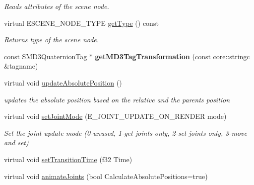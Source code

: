 \begin{DoxyCompactItemize}
\begin{DoxyCompactList}\small\item\em Reads attributes of the scene node. \end{DoxyCompactList}\item 
\hypertarget{classirr_1_1scene_1_1_c_animated_mesh_scene_node_a9f598a060ecf7f6b189f4c67db7e97e8}{virtual E\-S\-C\-E\-N\-E\-\_\-\-N\-O\-D\-E\-\_\-\-T\-Y\-P\-E \hyperlink{classirr_1_1scene_1_1_c_animated_mesh_scene_node_a9f598a060ecf7f6b189f4c67db7e97e8}{get\-Type} () const }\label{classirr_1_1scene_1_1_c_animated_mesh_scene_node_a9f598a060ecf7f6b189f4c67db7e97e8}

\begin{DoxyCompactList}\small\item\em Returns type of the scene node. \end{DoxyCompactList}\item 
\hypertarget{classirr_1_1scene_1_1_c_animated_mesh_scene_node_a3874ee494497b6b73233bfdbe3053389}{const S\-M\-D3\-Quaternion\-Tag $\ast$ {\bfseries get\-M\-D3\-Tag\-Transformation} (const core\-::stringc \&tagname)}\label{classirr_1_1scene_1_1_c_animated_mesh_scene_node_a3874ee494497b6b73233bfdbe3053389}

\item 
\hypertarget{classirr_1_1scene_1_1_c_animated_mesh_scene_node_a4151c69bbb6f54d01c93ec9c873de49c}{virtual void \hyperlink{classirr_1_1scene_1_1_c_animated_mesh_scene_node_a4151c69bbb6f54d01c93ec9c873de49c}{update\-Absolute\-Position} ()}\label{classirr_1_1scene_1_1_c_animated_mesh_scene_node_a4151c69bbb6f54d01c93ec9c873de49c}

\begin{DoxyCompactList}\small\item\em updates the absolute position based on the relative and the parents position \end{DoxyCompactList}\item 
\hypertarget{classirr_1_1scene_1_1_c_animated_mesh_scene_node_a8907f9341290947ab37d54f84bac6fca}{virtual void \hyperlink{classirr_1_1scene_1_1_c_animated_mesh_scene_node_a8907f9341290947ab37d54f84bac6fca}{set\-Joint\-Mode} (E\-\_\-\-J\-O\-I\-N\-T\-\_\-\-U\-P\-D\-A\-T\-E\-\_\-\-O\-N\-\_\-\-R\-E\-N\-D\-E\-R mode)}\label{classirr_1_1scene_1_1_c_animated_mesh_scene_node_a8907f9341290947ab37d54f84bac6fca}

\begin{DoxyCompactList}\small\item\em Set the joint update mode (0-\/unused, 1-\/get joints only, 2-\/set joints only, 3-\/move and set) \end{DoxyCompactList}\item 
virtual void \hyperlink{classirr_1_1scene_1_1_c_animated_mesh_scene_node_a2edf54a8ebc4c572bdc521aee1f1d5c7}{set\-Transition\-Time} (f32 Time)
\item 
\hypertarget{classirr_1_1scene_1_1_c_animated_mesh_scene_node_a4608665882faac01ba7d2c77c032bdce}{virtual void \hyperlink{classirr_1_1scene_1_1_c_animated_mesh_scene_node_a4608665882faac01ba7d2c77c032bdce}{animate\-Joints} (bool Calculate\-Absolute\-Positions=true)}\label{classirr_1_1scene_1_1_c_animated_mesh_scene_node_a4608665882faac01ba7d2c77c032bdce}


\end{DoxyCompactItemize}
